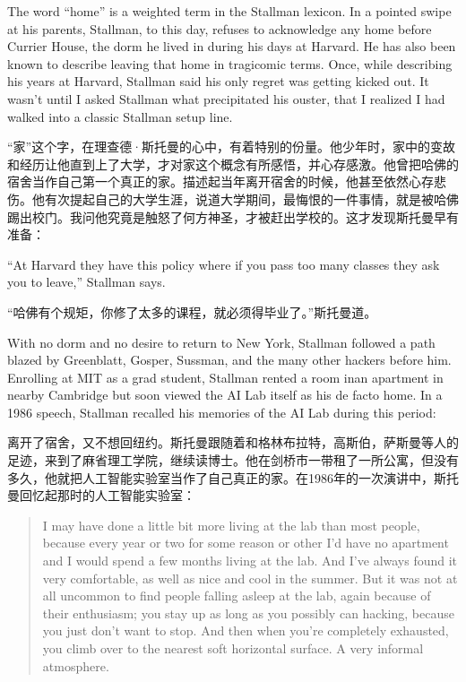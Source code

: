 \ifdefined\eng
The word ``home'' is a weighted term in the Stallman lexicon. In a pointed swipe at his parents, Stallman, to this day, refuses to acknowledge any home before Currier House, the dorm he lived in during his days at Harvard. He has also been known to describe leaving that home in tragicomic terms. Once, while describing his years at Harvard, Stallman said his only regret was getting kicked out. It wasn't until I asked Stallman what precipitated his ouster, that I realized I had walked into a classic Stallman setup line.
\fi

\ifdefined\chs
``家''这个字，在理查德·斯托曼的心中，有着特别的份量。他少年时，家中的变故和经历让他直到上了大学，才对家这个概念有所感悟，并心存感激。他曾把哈佛的宿舍当作自己第一个真正的家。描述起当年离开宿舍的时候，他甚至依然心存悲伤。他有次提起自己的大学生涯，说道大学期间，最悔恨的一件事情，就是被哈佛踢出校门。我问他究竟是触怒了何方神圣，才被赶出学校的。这才发现斯托曼早有准备：
\fi

\ifdefined\eng
``At Harvard they have this policy where if you pass too many classes they ask you to leave,'' Stallman says.
\fi

\ifdefined\chs
``哈佛有个规矩，你修了太多的课程，就必须得毕业了。''斯托曼道。
\fi

\ifdefined\eng
With no dorm and no desire to return to New York, Stallman followed a path blazed by Greenblatt, Gosper, Sussman, and the many other hackers before him. Enrolling at MIT as a grad student, Stallman rented \ifdefined\vtwo a room in\fi an apartment in nearby Cambridge but soon viewed the AI Lab itself as his de facto home. In a 1986 speech, Stallman recalled his memories of the AI Lab during this period:
\fi

\ifdefined\chs
离开了宿舍，又不想回纽约。斯托曼跟随着和格林布拉特，高斯伯，萨斯曼等人的足迹，来到了麻省理工学院，继续读博士。他在剑桥市一带租了一所公寓，但没有多久，他就把人工智能实验室当作了自己真正的家。在1986年的一次演讲中，斯托曼回忆起那时的人工智能实验室：
\fi

\ifdefined\eng
\begin{quote}
I may have done a little bit more living at the lab than most people, because every year or two for some reason or other I'd have no apartment and I would spend a few months living at the lab. And I've always found it very comfortable, as well as nice and cool in the summer. But it was not at all uncommon to find people falling asleep at the lab, again because of their enthusiasm; you stay up as long as you possibly can hacking, because you just don't want to stop. And then when you're completely exhausted, you climb over to the nearest soft horizontal surface. A very informal atmosphere.
\end{quote}
\fi

